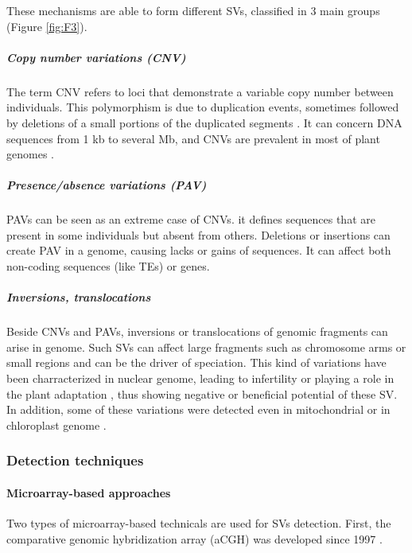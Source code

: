 \documentclass[a4paper, 12pt]{article}
\begin{document}
\begin{onehalfspace}
These mechanisms are able to form different SVs, classified in 3 main groups (Figure \ref{fig:F3}).

            \subparagraph{Copy number variations (CNV)}
            
The term CNV refers to loci that demonstrate a variable copy number between individuals. This polymorphism is due to duplication events, sometimes followed by deletions of a small portions of the duplicated segments \citep{Redon2006}. It can concern DNA sequences from 1 kb to several Mb, and CNVs are prevalent in most of plant genomes \citep{Zmienko2013}.

            \subparagraph{Presence/absence variations (PAV)}
                    
PAVs can be seen as an extreme case of CNVs. it defines sequences that are present in some individuals but absent from others. Deletions or insertions can create PAV in a genome, causing lacks or gains of sequences. It can affect both non-coding sequences (like TEs) or genes.

            \subparagraph{Inversions, translocations}

Beside CNVs and PAVs, inversions or translocations of genomic fragments can arise in genome. Such SVs can affect large fragments such as chromosome arms or small regions and can be the driver of speciation. This kind of variations have been charracterized in nuclear genome, leading to infertility \citep{Mach2011} or playing a role in the plant adaptation \citep{Kirkpatrick2010}, thus showing negative or beneficial potential of these SV. In addition, some of these variations were detected even in mitochondrial \citep{Mackenzie1999} or in chloroplast genome \citep{Kim2005}.
    
            \subsubsection{Detection techniques}
            
                    \paragraph{Microarray-based approaches}

Two types of microarray-based technicals are used for SVs detection. First, the comparative genomic hybridization array (aCGH) was developed since 1997 \citep{Solinas-Toldo1997}. 

\newpage %
\thispagestyle{empty}
~
\addtocounter{page}{-1}
\newpage
\clearpage %


\end{onehalfspace}
\end{document}
